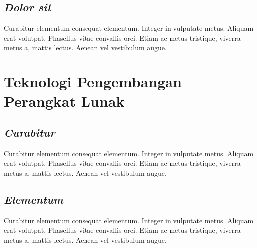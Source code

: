 \subsection{\emph{Dolor sit}}
\label{subsec:label}

Curabitur elementum consequat elementum. Integer in vulputate
metus. Aliquam erat volutpat. Phasellus vitae convallis orci. Etiam ac
metus tristique, viverra metus a, mattis lectus. Aenean vel vestibulum
augue.



\section{Teknologi Pengembangan Perangkat Lunak}

\subsection{\emph{Curabitur}}

Curabitur elementum consequat elementum. Integer in vulputate
metus. Aliquam erat volutpat. Phasellus vitae convallis orci. Etiam ac
metus tristique, viverra metus a, mattis lectus. Aenean vel vestibulum
augue.

\subsection{\emph{Elementum}}

Curabitur elementum consequat elementum. Integer in vulputate
metus. Aliquam erat volutpat. Phasellus vitae convallis orci. Etiam ac
metus tristique, viverra metus a, mattis lectus. Aenean vel vestibulum
augue.
